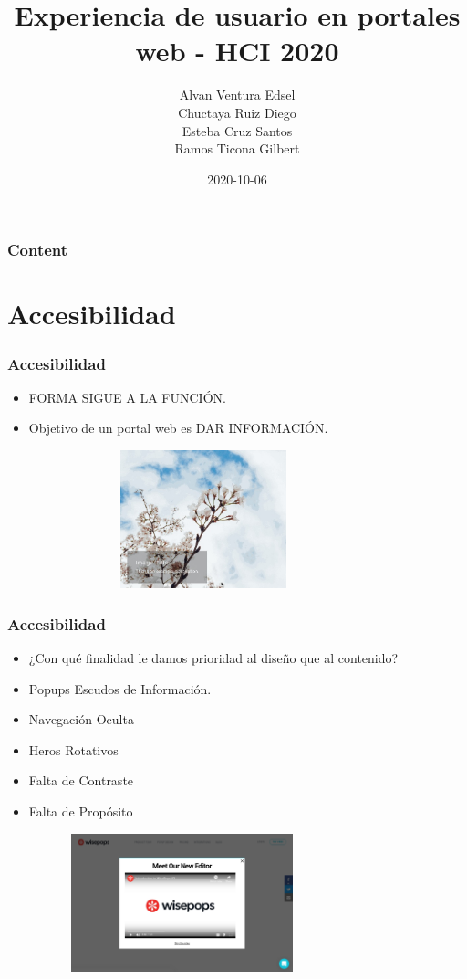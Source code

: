 \documentclass[11pt]{beamer}
\title[Experiencia de usuario en portales web]{\bf\Huge Experiencia de usuario en portales web - HCI 2020  }
\author[]
{
    Alvan Ventura Edsel\inst{1}\\
	Chuctaya Ruiz Diego \inst{2}\\
	Esteba Cruz Santos \inst{3}\\
	Ramos Ticona Gilbert\inst{4}
}
\institute[UNSA]
{
\inst{1}%
System Engineering School\\
}
\date[2020-10-06]{\scriptsize{2020-10-06}}
\begin{document}
    \begin{frame}
    \titlepage
    \end{frame}
    
    
    \begin{frame}
    \frametitle{Content}
    \tableofcontents
    \end{frame}
    
    \section{Accesibilidad}
    \begin{frame}
    \frametitle{Accesibilidad}
    \begin{itemize}
     \item FORMA SIGUE A LA FUNCIÓN.
     \item Objetivo de un portal web es DAR INFORMACIÓN.
    \begin{figure}[t]
    \includegraphics[width=8cm, height=4cm]{over.jpg}
    \centering
    \end{figure}
    \end{itemize}
    \end{frame}
    
    \begin{frame}
    \frametitle{Accesibilidad}
    \begin{itemize}
     \item ¿Con qué finalidad le damos prioridad al diseño que al contenido?
      \item Popups Escudos de Información.
      \item Navegación Oculta
      \item Heros Rotativos
      \item Falta de Contraste
      \item Falta de Propósito
     \end{itemize}
     
     \begin{figure}[t]
    \includegraphics[width=8cm, height=4cm]{pop.png}
    \centering
    \end{figure}
    \end{frame}
    
\end{document}
